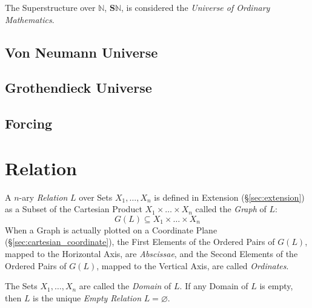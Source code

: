 The Superstructure over $\mathbb{N}$, $\mathbf{S}\mathbb{N}$, is
considered the \emph{Universe of Ordinary Mathematics}.



\subsection{Von Neumann Universe}\label{sec:vonneumann_universe}

\subsection{Grothendieck Universe}\label{sec:grothendieck_universe}


\subsection{Forcing}\label{sec:forcing}



\section{Relation}\label{sec:relation}

A $n$-ary \emph{Relation} $L$ over Sets $X_1, \ldots, X_n$ is defined
in Extension (\S\ref{sec:extension}) as a Subset of the Cartesian
Product $X_1 \times \ldots \times X_n$ called the \emph{Graph} of $L$:
\[
  G(L) \subseteq X_1 \times \ldots \times X_n
\]
When a Graph is actually plotted on a Coordinate Plane
(\S\ref{sec:cartesian_coordinate}), the First Elements of the Ordered
Pairs of $G(L)$, mapped to the Horizontal Axis, are \emph{Abscissae},
and the Second Elements of the Ordered Pairs of $G(L)$, mapped to the
Vertical Axis, are called \emph{Ordinates}.

The Sets $X_1, \ldots, X_n$ are called the \emph{Domain} of $L$. If
any Domain of $L$ is empty, then $L$ is the unique \emph{Empty
  Relation} $L = \varnothing$.

